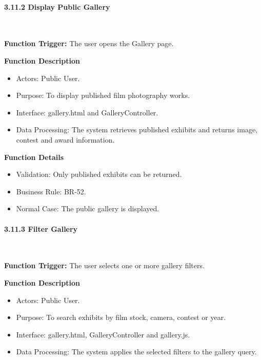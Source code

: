 \paragraph*{3.11.2 Display Public Gallery}\leavevmode\\[-0.5em]
\label{par:display-public-gallery}

\textbf{Function Trigger:} The user opens the Gallery page.

\textbf{Function Description}
\begin{itemize}[leftmargin=1.5em, nosep]
    \item Actors: Public User.
    \item Purpose: To display published film photography works.
    \item Interface: gallery.html and GalleryController.
    \item Data Processing: The system retrieves published exhibits and returns image, contest and award information.
\end{itemize}

\textbf{Function Details}
\begin{itemize}[leftmargin=1.5em, nosep]
    \item Validation: Only published exhibits can be returned.
    \item Business Rule: BR-52.
    \item Normal Case: The public gallery is displayed.
\end{itemize}

\paragraph*{3.11.3 Filter Gallery}\leavevmode\\[-0.5em]
\label{par:filter-gallery}

\textbf{Function Trigger:} The user selects one or more gallery filters.

\textbf{Function Description}
\begin{itemize}[leftmargin=1.5em, nosep]
    \item Actors: Public User.
    \item Purpose: To search exhibits by film stock, camera, contest or year.
    \item Interface: gallery.html, GalleryController and gallery.js.
    \item Data Processing: The system applies the selected filters to the gallery query.
\end{itemize}

